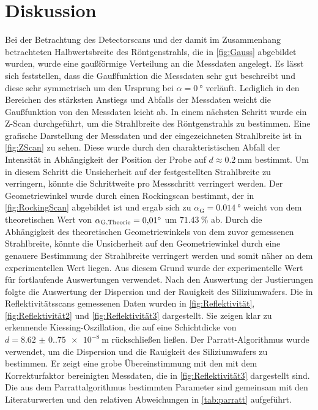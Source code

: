 \section{Diskussion}
\label{sec:Diskussion}

Bei der Betrachtung des Detectorscans und der damit im Zusammenhang betrachteten Halbwertsbreite des Röntgenstrahls, die in \autoref{fig:Gauss} abgebildet wurden, wurde eine gaußförmige Verteilung an die Messdaten angelegt.
Es lässt sich feststellen, dass die Gaußfunktion die Messdaten sehr gut beschreibt und diese sehr symmetrisch um den Ursprung bei $\alpha=\SI{0}{\degree}$ verläuft.
Lediglich in den Bereichen des stärksten Anstiegs und Abfalls der Messdaten weicht die Gaußfunktion von den Messdaten leicht ab. \newline
In einem nächsten Schritt wurde ein Z-Scan durchgeführt, um die Strahlbreite des Röntgenstrahls zu bestimmen.
Eine grafische Darstellung der Messdaten und der eingezeichneten Strahlbreite ist in \autoref{fig:ZScan} zu sehen.
Diese wurde durch den charakteristischen Abfall der Intensität in Abhängigkeit der Position der Probe auf $d\approx\SI{0.2}{\milli\meter}$ bestimmt.
Um in diesem Schritt die Unsicherheit auf der festgestellten Strahlbreite zu verringern, könnte die Schrittweite pro Messschritt verringert werden. \newline
Der Geometriewinkel wurde durch einen Rockingscan bestimmt, der in \autoref{fig:RockingScan} abgebildet ist und ergab sich zu $\alpha_{\text{G}}=\SI{0.014}{\degree}$ weicht von dem theoretischen Wert von $\alpha_{\text{G,\text{Theorie}}}=\SI{0.01}{\degree}$ um $\SI{71.43}{\percent}$ ab.
Durch die Abhängigkeit des theoretischen Geometriewinkels von dem zuvor gemessenen Strahlbreite, könnte die Unsicherheit auf den Geometriewinkel durch eine genauere Bestimmung der Strahlbreite verringert werden und somit näher an dem experimentellen Wert liegen.
Aus diesem Grund wurde der experimentelle Wert für fortlaufende Auswertungen verwendet. \newline
Nach den Auswertung der Justierungen folgte die Auswertung der Dispersion und der Rauigkeit des Siliziumwafers.
Die in Reflektivitätsscans gemessenen Daten wurden in \autoref{fig:Reflektivität}, \autoref{fig:Reflektivität2} und \autoref{fig:Reflektivität3} dargestellt.
Sie zeigen klar zu erkennende Kiessing-Oszillation, die auf eine Schichtdicke von $d = \SI{8.62(0.75)e-8}{\meter}$ rückschließen ließen.\newline
Der Parratt-Algorithmus wurde verwendet, um die Dispersion und die Rauigkeit des Siliziumwafers zu bestimmen.
Er zeigt eine grobe Übereinstimmung mit den mit dem Korrekturfaktor bereinigten Messdaten, die in \autoref{fig:Reflektivität3} dargestellt sind. 
Die aus dem Parrattalgorithmus bestimmten Parameter sind gemeinsam mit den Literaturwerten und den relativen Abweichungen in \autoref{tab:parratt} aufgeführt.

